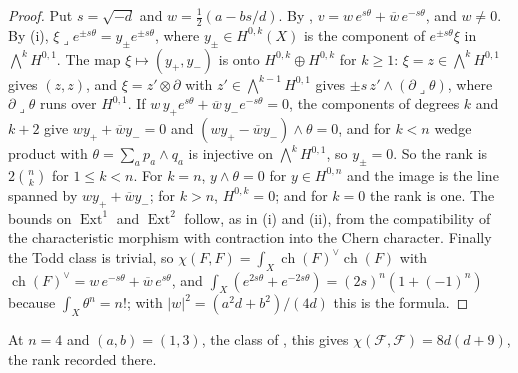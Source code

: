 \documentclass[11pt,reqno]{amsart}
\theoremstyle{plain}
\theoremstyle{definition}
\theoremstyle{remark}
\newcommand{\cF}{\mathcal{F}}
\DeclareMathOperator{\ch}{ch}
\DeclareMathOperator{\Ext}{Ext}
\newcommand{\bbar}[1]{\overline{#1}}
\begin{document}
\begin{proof}
Put $s=\sqrt{-d}$ and $w=\frac12(a-bs/d)$. By \cite[Theorem~14.5(i)]{paperI},
$v=w\,e^{s\theta}+\bbar w\,e^{-s\theta}$, and $w\ne0$. By
(i), $\xi\lrcorner e^{\pm s\theta}=y_{\pm}e^{\pm s\theta}$,
where $y_{\pm}\in H^{0,k}(X)$ is the component of $e^{\pm s\theta}\xi$ in
$\bigwedge^{k}H^{0,1}$. The map $\xi\mapsto(y_{+},y_{-})$ is onto
$H^{0,k}\oplus H^{0,k}$ for $k\ge1$: $\xi=z\in\bigwedge^{k}H^{0,1}$ gives
$(z,z)$, and $\xi=z'\otimes\partial$ with $z'\in\bigwedge^{k-1}H^{0,1}$ gives
$\pm s\,z'\wedge(\partial\lrcorner\theta)$, where $\partial\lrcorner\theta$ runs
over $H^{0,1}$. If $w\,y_{+}e^{s\theta}+\bbar w\,y_{-}e^{-s\theta}=0$, the
components of degrees $k$ and $k+2$ give $wy_{+}+\bbar wy_{-}=0$ and
$(wy_{+}-\bbar wy_{-})\wedge\theta=0$, and for $k<n$ wedge product with
$\theta=\sum_{a}p_{a}\wedge q_{a}$ is injective on $\bigwedge^{k}H^{0,1}$, so
$y_{\pm}=0$. So the rank is $2\binom{n}{k}$ for $1\le k<n$. For $k=n$,
$y\wedge\theta=0$ for $y\in H^{0,n}$ and the image is the line spanned by
$wy_{+}+\bbar wy_{-}$; for $k>n$, $H^{0,k}=0$; and for $k=0$ the rank is one.
The bounds on $\Ext^{1}$ and $\Ext^{2}$ follow, as in (i)
and (ii), from the compatibility of the characteristic morphism with
contraction into the Chern character. Finally the Todd class
is trivial, so $\chi(F,F)=\int_{X}\ch(F)^{\vee}\ch(F)$ with
$\ch(F)^{\vee}=w\,e^{-s\theta}+\bbar w\,e^{s\theta}$, and
$\int_{X}(e^{2s\theta}+e^{-2s\theta})=(2s)^{n}(1+(-1)^{n})$ because
$\int_{X}\theta^{n}=n!$; with $|w|^{2}=(a^{2}d+b^{2})/(4d)$ this is the
formula.
\end{proof}

At $n=4$ and $(a,b)=(1,3)$, the class of , this gives
$\chi(\cF,\cF)=8d(d+9)$, the rank recorded there.
\end{document}
